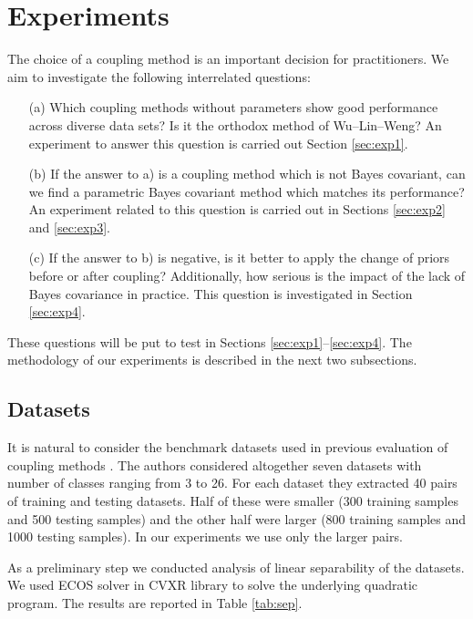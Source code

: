 \section{Experiments}

The choice of a coupling method is an important decision for practitioners. We aim to investigate the following interrelated questions:

\begin{itemize}
	\item[(a)] Which coupling methods without parameters show good performance across diverse data sets? Is it the orthodox method of Wu--Lin--Weng? An experiment to answer this question is carried out Section \ref{sec:exp1}. 
	\item[(b)] If the answer to a) is a coupling method which is not Bayes covariant, can we find a parametric Bayes covariant method which  matches its performance? An experiment related to this question is carried out in  Sections \ref{sec:exp2} and \ref{sec:exp3}.
	\item[(c)] If the answer to b) is negative, is it better to apply the change of priors before or after coupling? Additionally, how serious is the impact of the lack of Bayes covariance in practice. This question is investigated in Section \ref{sec:exp4}.
\end{itemize}

These questions will be put to test in Sections \ref{sec:exp1}--\ref{sec:exp4}. The methodology of our experiments is described in the next two subsections.

\subsection{Datasets}

It is natural to consider the benchmark datasets used in previous evaluation of coupling methods \cite{wu2004probability}. The authors considered altogether seven datasets with number of classes ranging from 3 to 26. For each dataset they extracted 40 pairs of training and testing datasets. Half of these were smaller (300 training samples and 500 testing samples) and the other half were larger (800 training samples and 1000 testing samples). In our experiments we use only the larger pairs. 

As a preliminary step we conducted analysis of linear separability of the datasets. We used ECOS solver in CVXR library to solve the underlying quadratic program. The results are reported in Table \ref{tab:sep}.

